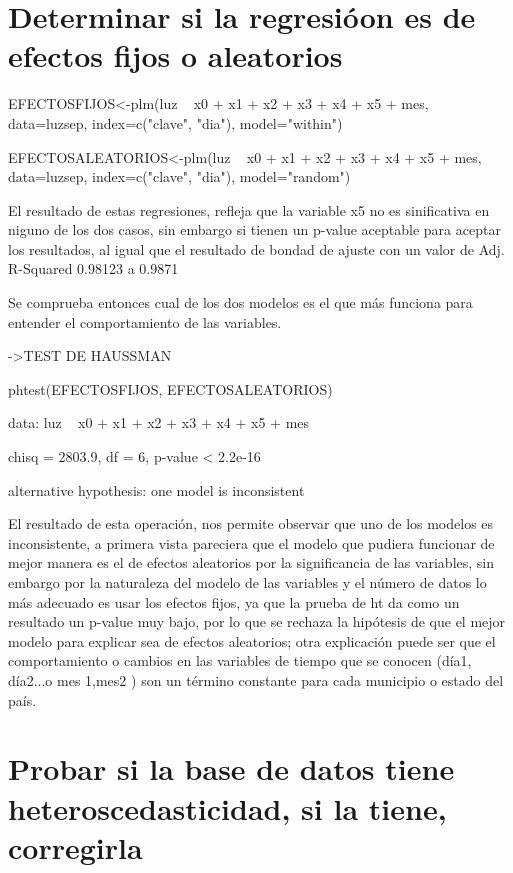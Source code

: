 \documentclass[letterpapper,12pt]{article}
\begin{document}
\section{Determinar si la regresióon es de efectos fijos o aleatorios}

EFECTOSFIJOS<-plm(luz ~ x0 + x1 + x2 + x3 + x4 + x5 + mes, data=luzsep, index=c("clave", "dia"), model="within")



EFECTOSALEATORIOS<-plm(luz ~ x0 + x1 + x2 + x3 + x4 + x5 + mes, data=luzsep, index=c("clave", "dia"), model="random")



El resultado de estas regresiones, refleja que la variable x5 no es sinificativa en niguno de los dos casos, sin embargo si tienen un p-value aceptable para aceptar los resultados, al igual que el resultado de bondad de ajuste con un valor  de Adj. R-Squared 0.98123 a 0.9871

Se comprueba entonces cual de los dos modelos es el que más funciona para entender el comportamiento de las variables.



->TEST DE HAUSSMAN


phtest(EFECTOSFIJOS, EFECTOSALEATORIOS)


data:  luz ~ x0 + x1 + x2 + x3 + x4 + x5 + mes


chisq = 2803.9, df = 6, p-value < 2.2e-16


alternative hypothesis: one model is inconsistent




El resultado de esta operación, nos permite observar que uno de los modelos es inconsistente, a primera vista pareciera que el modelo que pudiera funcionar de mejor manera es el de efectos aleatorios por la significancia de las variables,  sin embargo  por la naturaleza del modelo de las variables y el número de datos lo más adecuado es usar los efectos fijos, ya que la prueba de ht da como un resultado un p-value muy bajo, por lo que se rechaza la hipótesis de que el mejor modelo para explicar sea de efectos aleatorios; otra explicación puede ser que el comportamiento o cambios en las variables de tiempo  que se conocen (día1, día2...o mes 1,mes2 ) son un término constante para cada municipio o estado del país.


\section{Probar si la base de datos tiene heteroscedasticidad, si la tiene, corregirla}
\end{document}
